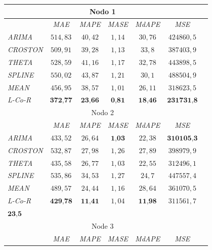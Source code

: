\documentclass[runningheads]{llncs}
\begin{document}
\begin{table} \footnotesize
 \begin{center}
 \begin{tabular}{|l|c|c|c|c|c|c|}


\hline 
 \multicolumn{6}{|c|}{Nodo 1} \\ 
 \hline 
 & \emph{MAE} & \emph{MAPE} & \emph{MASE} & \emph{MdAPE} & \emph{MSE} \\%
\hline

\emph{ARIMA } & $514,83$ & $40,42$ & $1,14$ & $30,76$ & $424860,5$ \\%
\emph{CROSTON } & $509,91$ & $39,28$ & $1,13$ & $33,8$ & $387403,9$ \\%
\emph{THETA } & $528,59$ & $41,16$ & $1,17$ & $32,78$ & $443898,5$ \\%
\emph{SPLINE } & $550,02$ & $43,87$ & $1,21$ & $30,1$ & $488504,9$ \\%
\emph{MEAN } & $456,95$ & $38,57$ & $1,01$ & $26,11$ & $318623,5$ \\%
\emph{L-Co-R} & $\textbf{372,77}$ & $\textbf{23,66}$ & $\textbf{0,81}$ & $\textbf{18,46}$ &
$\textbf{231731,8}$ \\%
\hline 
 \multicolumn{6}{|c|}{Nodo 2} \\ 
 \hline 
 & \emph{MAE} & \emph{MAPE} & \emph{MASE} & \emph{MdAPE} & \emph{MSE} \\%
\hline

\emph{ARIMA } & $433,52$ & $26,64$ & $\textbf{1,03}$ & $22,38$ & $\textbf{310105,3}$ \\%
\emph{CROSTON } & $532,87$ & $27,98$ & $1,26$ & $27,89$ & $398979,9$ \\%
\emph{THETA } & $435,58$ & $26,77$ & $1,03$ & $22,55$ & $312496,1$ \\%
\emph{SPLINE } & $535,86$ & $34,53$ & $1,27$ & $24,7$ & $447557,4$ \\%
\emph{MEAN } & $489,57$ & $24,44$ & $1,16$ & $28,64$ & $361070,5$ \\%
\emph{L-Co-R} & $\textbf{429,78}$ & $\textbf{11,41}$ & $1,04$ & $\textbf{11,98}$ & $311561,7$ \\%
$\textbf{23,5}$ \\ 
\hline 
 \multicolumn{6}{|c|}{Node 3} \\ 
 \hline 
 & \emph{MAE} & \emph{MAPE} & \emph{MASE} & \emph{MdAPE} & \emph{MSE} \\%
\hline


\end{tabular}
\end{center}
\end{table}
\end{document}
